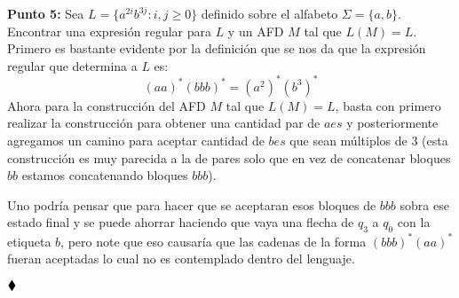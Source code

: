 \textbf{Punto 5: }Sea $L=\{a^{2i}b^{3j}:i,j\geq0\}$ definido sobre el alfabeto $\Sigma=\{a,b\}.$ Encontrar una expresión regular para $L$ y un AFD $M$ tal que $L(M)=L.$\\

 Primero es bastante evidente por la definición que se nos da que la expresión regular que determina a $L$ es:
$$(aa)^*(bbb)^*=\left(a^2\right)^*\left(b^3\right)^*$$
Ahora para la construcción del AFD $M$ tal que $L(M)=L$, basta con primero realizar la construcción para obtener una cantidad par de $aes$ y posteriormente agregamos un camino para aceptar cantidad de $bes$ que sean múltiplos de $3$ (esta construcción es muy parecida a la de pares solo que en vez de concatenar bloques $bb$ estamos concatenando bloques $bbb$).
    \begin{basedtikz}
    \centering
    \end{basedtikz}
    Uno podría pensar que para hacer que se aceptaran esos bloques de $bbb$ sobra ese estado final y se puede ahorrar haciendo que vaya una flecha de $q_3$ a $q_0$ con la etiqueta $b$, pero note que eso causaría que las cadenas de la forma $(bbb)^*(aa)^*$ fueran aceptadas lo cual no es contemplado dentro del lenguaje.
    
    $\hfill \blacklozenge$